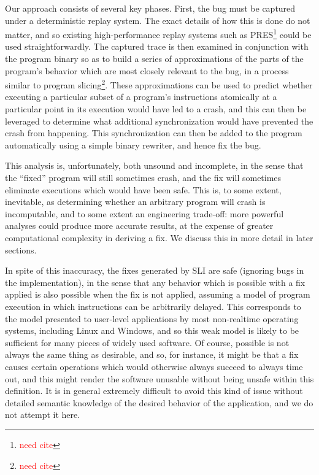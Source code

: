 \documentclass[10pt,twocolumn,preprint,natbib,authoryear]{sigplanconf}
\newcommand{\editorial}[1]{\textcolor{red}{\footnote{\textcolor{red}{#1}}}}
\newcommand{\needCite}{\editorial{need cite}}
\begin{document}
Our approach consists of several key phases.  First, the bug must be
captured under a deterministic replay system.  The exact details of
how this is done do not matter, and so existing high-performance
replay systems such as PRES\needCite{} could be used
straightforwardly.  The captured trace is then examined in conjunction
with the program binary so as to build a series of approximations of
the parts of the program's behavior which are most closely relevant
to the bug, in a process similar to program slicing\needCite{}.  These
approximations can be used to predict whether executing a particular
subset of a program's instructions atomically at a particular point in
its execution would have led to a crash, and this can then be
leveraged to determine what additional synchronization would have
prevented the crash from happening.  This synchronization can then be
added to the program automatically using a simple binary rewriter, and
hence fix the bug.

This analysis is, unfortunately, both unsound and incomplete, in the
sense that the ``fixed'' program will still sometimes crash, and the
fix will sometimes eliminate executions which would have been safe.
This is, to some extent, inevitable, as determining whether an
arbitrary program will crash is incomputable, and to some extent an
engineering trade-off: more powerful analyses could produce more
accurate results, at the expense of greater computational complexity
in deriving a fix.  We discuss this in more detail in later sections.

In spite of this inaccuracy, the fixes generated by SLI are safe
(ignoring bugs in the implementation), in the sense that any behavior
which is possible with a fix applied is also possible when the fix is
not applied, assuming a model of program execution in which
instructions can be arbitrarily delayed.  This corresponds to the
model presented to user-level applications by most non-realtime
operating systems, including Linux and Windows, and so this weak model
is likely to be sufficient for many pieces of widely used software.
Of course, possible is not always the same thing as desirable, and so,
for instance, it might be that a fix causes certain operations which
would otherwise always succeed to always time out, and this might
render the software unusable without being unsafe within this
definition.  It is in general extremely difficult to avoid this kind
of issue without detailed semantic knowledge of the desired behavior
of the application, and we do not attempt it here.
\end{document}
